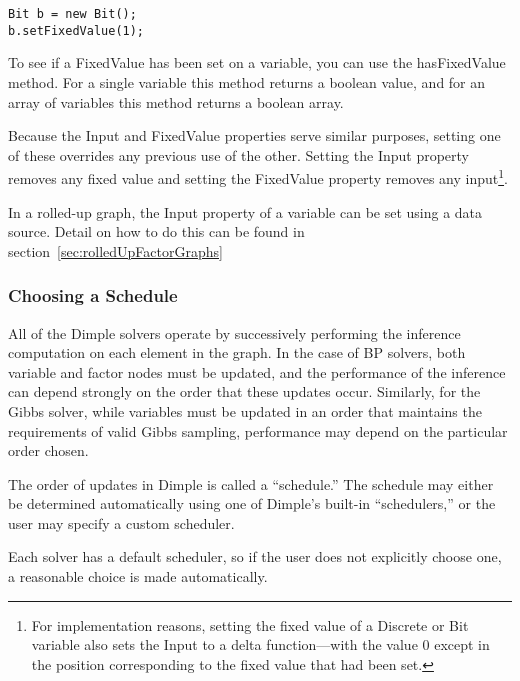 \fi

\ifjava
\begin{lstlisting}
Bit b = new Bit();
b.setFixedValue(1);
\end{lstlisting}
\fi

To see if a FixedValue has been set on a variable, you can use the hasFixedValue method.  \ifmatlab For a single variable this method returns a boolean value, and for an array of variables this method returns a boolean array. \fi

Because the Input and FixedValue properties serve similar purposes, setting one of these overrides any previous use of the other.  Setting the Input property removes any fixed value and setting the FixedValue property removes any input\footnote{For implementation reasons, setting the fixed value of a Discrete or Bit variable also sets the Input to a delta function---with the value 0 except in the position corresponding to the fixed value that had been set.}.



In a rolled-up graph, the Input property of a variable can be set using a data source.  Detail on how to do this can be found in section~\ref{sec:rolledUpFactorGraphs}



\subsubsection{Choosing a Schedule}

All of the Dimple solvers operate by successively performing the inference computation on each element in the graph.  In the case of BP solvers, both variable and factor nodes must be updated, and the performance of the inference can depend strongly on the order that these updates occur.  Similarly, for the Gibbs solver, while variables must be updated in an order that maintains the requirements of valid Gibbs sampling, performance may depend on the particular order chosen.

The order of updates in Dimple is called a ``schedule.''  The schedule may either be determined automatically using one of Dimple's built-in ``schedulers,'' or the user may specify a custom scheduler.

Each solver has a default scheduler, so if the user does not explicitly choose one, a reasonable choice is made automatically.




